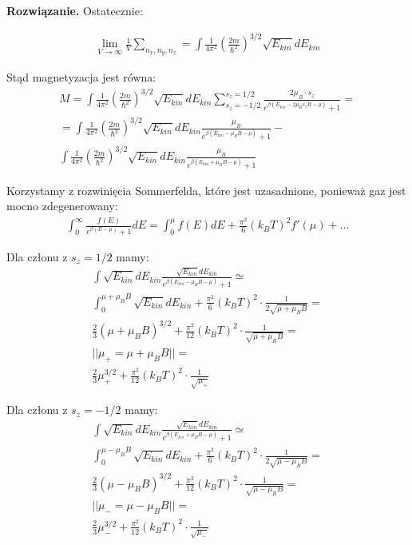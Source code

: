 \documentclass[11pt,a4paper]{article}
\newenvironment{solution}{\vspace{1cm} \par\textbf{Rozwiązanie.} \vspace{1cm}}{}
\begin{document}
\begin{solution}
Ostatecznie:

\begin{align*}
\lim_{V \to \infty} \frac{1}{V} \sum_{n_x, n_y, n_z} = \int \frac{1}{4\pi^{2}} \left( \frac{2m}{\hbar^2} \right)^{3/2} \sqrt{E_{kin}} dE_{kin}
\end{align*}

Stąd magnetyzacja jest równa:
\begin{align*}
M = \int \frac{1}{4\pi^{2}} \left( \frac{2m}{\hbar^2} \right)^{3/2} \sqrt{E_{kin}} dE_{kin} \sum_{s_z=-1/2}^{s_z=1/2} \frac{2\mu_B \cdot s_z }{e^{\beta (E_{kin} - 2\mu_B s_z B - \mu)} + 1} = \\
= \int \frac{1}{4\pi^{2}} \left( \frac{2m}{\hbar^2} \right)^{3/2} \sqrt{E_{kin}} dE_{kin} \frac{\mu_B}{e^{\beta (E_{kin} - \mu_B B - \mu)} + 1} - \\
  \int \frac{1}{4\pi^{2}} \left( \frac{2m}{\hbar^2} \right)^{3/2} \sqrt{E_{kin}} dE_{kin} \frac{\mu_B}{e^{\beta (E_{kin} + \mu_B B - \mu)} + 1} 
\end{align*}

Korzystamy z rozwinięcia Sommerfelda, które jest uzasadnione, ponieważ gaz jest mocno zdegenerowany:
\begin{align*}
\int_{0}^{\infty} \frac{f(E)}{e^{\beta (E - \mu)} + 1} dE = \int_{0}^{\mu} f(E) dE + \frac{\pi^2}{6} (k_B T)^2 f'(\mu) + \ldots
\end{align*}

Dla członu z $s_z = 1/2$ mamy:
\begin{align*}
\int \sqrt{E_{kin}} dE_{kin} \frac{\sqrt{E_{kin}} dE_{kin}}{e^{\beta (E_{kin} - \mu_B B - \mu)} + 1}  \simeq \\
\int_0^{\mu + \mu_B B} \sqrt{E_{kin}} dE_{kin} + \frac{\pi^2}{6} (k_B T)^2 \cdot \frac{1}{2\sqrt{\mu + \mu_B B}} = \\
\frac{2}{3} (\mu + \mu_B B)^{3/2} + \frac{\pi^2}{12} (k_B T)^2 \cdot \frac{1}{\sqrt{\mu + \mu_B B}} = \\
|| \mu_{+} = \mu + \mu_B B || = \\
\frac{2}{3} \mu_{+}^{3/2} + \frac{\pi^2}{12} (k_B T)^2 \cdot \frac{1}{\sqrt{\mu_{+}}}
\end{align*}

Dla członu z $s_z = -1/2$ mamy:
\begin{align*}
\int \sqrt{E_{kin}} dE_{kin} \frac{\sqrt{E_{kin}} dE_{kin}}{e^{\beta (E_{kin} + \mu_B B - \mu)} + 1}  \simeq \\  
\int_0^{\mu - \mu_B B} \sqrt{E_{kin}} dE_{kin} + \frac{\pi^2}{6} (k_B T)^2 \cdot \frac{1}{2\sqrt{\mu - \mu_B B}} = \\
\frac{2}{3} (\mu - \mu_B B)^{3/2} + \frac{\pi^2}{12} (k_B T)^2 \cdot \frac{1}{\sqrt{\mu - \mu_B B}} = \\
|| \mu_{-} = \mu - \mu_B B || = \\
\frac{2}{3} \mu_{-}^{3/2} + \frac{\pi^2}{12} (k_B T)^2 \cdot \frac{1}{\sqrt{\mu_{-}}}
\end{align*}


\end{solution}
\end{document}
